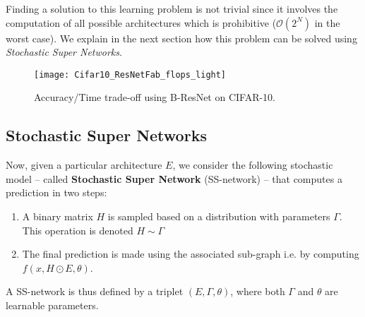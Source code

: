 \documentclass[10pt,twocolumn,letterpaper]{article}
\begin{document}
Finding a solution to this learning problem is not trivial since it involves the computation of all possible architectures which is prohibitive ($\mathcal{O}(2^N)$ in the worst case). We explain in the next section how this problem can be solved using \textit{Stochastic Super Networks}. 

\begin{figure}[t]
\centering
\texttt{[image: Cifar10\_ResNetFab\_flops\_light]} 
\caption{Accuracy/Time trade-off using B-ResNet on CIFAR-10.}
\label{plot_cif10_flop_rnf}
\end{figure}

\subsection{Stochastic Super Networks}
\label{secion_ssn}
\label{s4}




Now, given a particular architecture $E$, we consider the following stochastic model -- called \textbf{Stochastic Super Network} (SS-network) -- that computes a prediction in two steps: 
\begin{enumerate}
\item A binary matrix $H$ is sampled based on a distribution with parameters $\Gamma$. This operation is denoted $H \sim \Gamma$ 
\item The final prediction is made using the associated sub-graph i.e. by computing $f(x,H \odot E,\theta)$. 
\end{enumerate}
A SS-network is thus defined by a triplet $(E,\Gamma,\theta)$, where both $\Gamma$ and $\theta$ are learnable parameters. 
\end{document}
